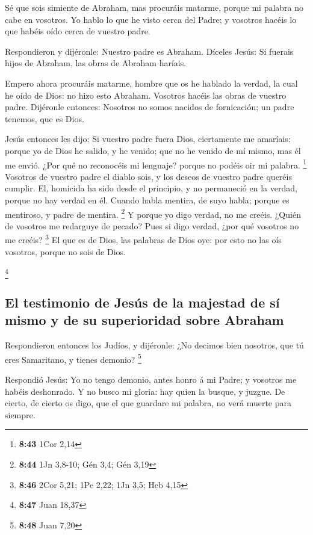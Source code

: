  Sé que sois simiente de Abraham, mas procuráis matarme,
porque mi palabra no cabe en vosotros.  Yo hablo lo que he
visto cerca del Padre; y vosotros hacéis lo que habéis oído cerca de
vuestro padre.

 Respondieron y dijéronle: Nuestro padre es Abraham.
Díceles Jesús: Si fuerais hijos de Abraham, las obras de Abraham
haríais.

 Empero ahora procuráis matarme, hombre que os he hablado
la verdad, la cual he oído de Dios: no hizo esto Abraham. 
Vosotros hacéis las obras de vuestro padre. Dijéronle entonces: Nosotros
no somos nacidos de fornicación; un padre tenemos, que es Dios.

 Jesús entonces les dijo: Si vuestro padre fuera Dios,
ciertamente me amaríais: porque yo de Dios he salido, y he venido; que
no he venido de mí mismo, mas él me envió.  ¿Por qué no
reconocéis mi lenguaje? porque no podéis oir mi palabra. \footnote{\textbf{8:43}
  1Cor 2,14}  Vosotros de vuestro padre el diablo sois, y
los deseos de vuestro padre queréis cumplir. El, homicida ha sido desde
el principio, y no permaneció en la verdad, porque no hay verdad en él.
Cuando habla mentira, de suyo habla; porque es mentiroso, y padre de
mentira. \footnote{\textbf{8:44} 1Jn 3,8-10; Gén 3,4; Gén 3,19}
 Y porque yo digo verdad, no me creéis. 
¿Quién de vosotros me redarguye de pecado? Pues si digo verdad, ¿por qué
vosotros no me creéis? \footnote{\textbf{8:46} 2Cor 5,21; 1Pe 2,22; 1Jn
  3,5; Heb 4,15}  El que es de Dios, las palabras de Dios
oye: por esto no las oís vosotros, porque no sois de Dios.

\footnote{\textbf{8:47} Juan 18,37}

\hypertarget{el-testimonio-de-jesuxfas-de-la-majestad-de-suxed-mismo-y-de-su-superioridad-sobre-abraham}{%
\subsection{El testimonio de Jesús de la majestad de sí mismo y de su
superioridad sobre
Abraham}\label{el-testimonio-de-jesuxfas-de-la-majestad-de-suxed-mismo-y-de-su-superioridad-sobre-abraham}}

 Respondieron entonces los Judíos, y dijéronle: ¿No decimos
bien nosotros, que tú eres Samaritano, y tienes demonio? \footnote{\textbf{8:48}
  Juan 7,20}

 Respondió Jesús: Yo no tengo demonio, antes honro á mi
Padre; y vosotros me habéis deshonrado.  Y no busco mi
gloria: hay quien la busque, y juzgue.  De cierto, de
cierto os digo, que el que guardare mi palabra, no verá muerte para
siempre.


